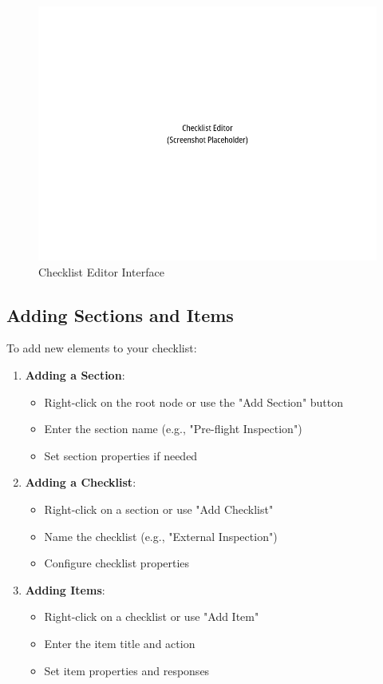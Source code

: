 \begin{figure}[H]
\centering
\includegraphics[width=\textwidth]{images/checklist_editor.png}
\caption{Checklist Editor Interface}
\label{fig:checklist_editor}
\end{figure}

\subsection{Adding Sections and Items}

To add new elements to your checklist:

\begin{enumerate}
    \item \textbf{Adding a Section}:
    \begin{itemize}
        \item Right-click on the root node or use the "Add Section" button
        \item Enter the section name (e.g., "Pre-flight Inspection")
        \item Set section properties if needed
    \end{itemize}
    
    \item \textbf{Adding a Checklist}:
    \begin{itemize}
        \item Right-click on a section or use "Add Checklist"
        \item Name the checklist (e.g., "External Inspection")
        \item Configure checklist properties
    \end{itemize}
    
    \item \textbf{Adding Items}:
    \begin{itemize}
        \item Right-click on a checklist or use "Add Item"
        \item Enter the item title and action
        \item Set item properties and responses
    \end{itemize}
\end{enumerate}


